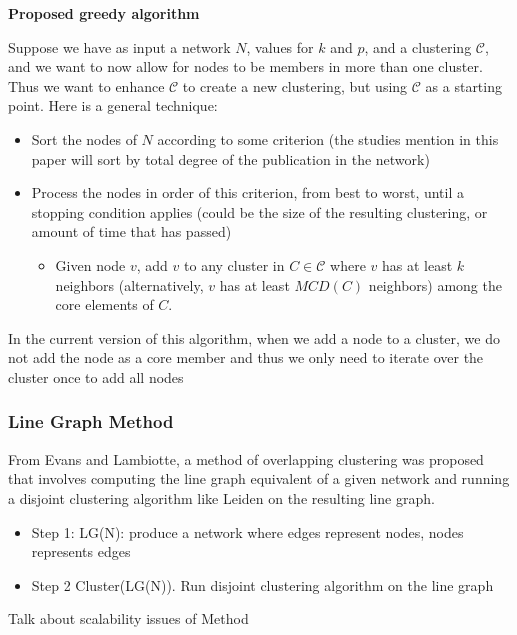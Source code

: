\documentclass{article}
\begin{document}
\textbf{Proposed greedy algorithm}

Suppose we have as input a network $N$, values for $k$ and $p$, and a clustering $\mathcal{C}$, and we want to now allow for nodes to be members in more than one cluster.  Thus we want to enhance $\mathcal{C}$ to create a new clustering, but using $\mathcal{C}$ as a starting point.
Here is a general technique:

\begin{itemize}
	\item Sort the nodes of $N$ according to some criterion (the studies mention in this paper will sort by total degree of the publication in the network)
	\item Process the nodes in order of this criterion, from best to worst, until a stopping condition applies (could be the size of the resulting clustering, or amount of time that has passed)
	\begin{itemize}
		\item Given node $v$, add $v$ to any cluster in $C \in \mathcal{C}$ where $v$ has at least $k$ neighbors (alternatively, 
		$v$ has at least $MCD(C)$ neighbors) among the core elements of $C$.
	\end{itemize}
\end{itemize}

In the current version of this algorithm, when we add a node to a cluster, we do not add the node as a core member and thus we only need to iterate over the cluster once to add all nodes



\subsubsection{Line Graph Method}

From Evans and Lambiotte, a method of overlapping clustering was proposed that involves computing the line graph equivalent of a given network and running a disjoint clustering algorithm like Leiden on the resulting line graph. 
\begin{itemize}
	\item Step 1: LG(N): produce a network where edges represent nodes, nodes represents edges
	\item Step 2 Cluster(LG(N)). Run disjoint clustering algorithm on the line graph
\end{itemize}

Talk about scalability issues of Method
\end{document}
